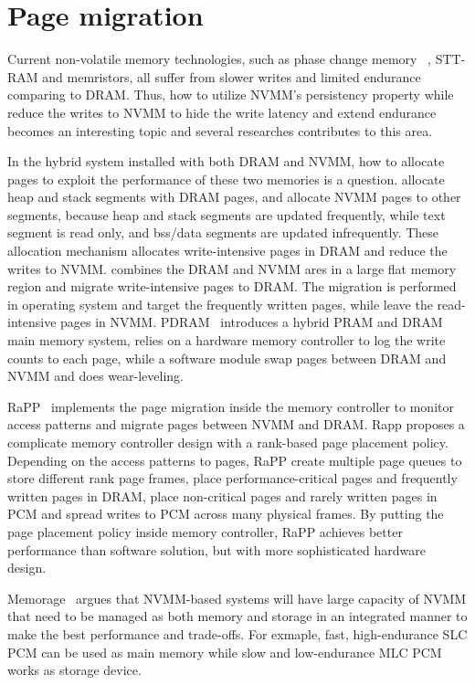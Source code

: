 \section{Page migration} 
\label{sec:migration}

Current non-volatile memory technologies, such as phase change memory
~\cite{PCMHierarchy}, STT-RAM and memristors, all suffer from slower writes and
limited endurance comparing to DRAM.
Thus, how to utilize NVMM's persistency property while reduce the writes to
NVMM to hide the write latency and extend endurance becomes an interesting
topic and several researches contributes to this area.

In the hybrid system installed with both DRAM and NVMM, how to allocate
pages to exploit the performance of these two memories is a question.
\cite{pcmalloc} allocate heap and stack segments with DRAM pages, and allocate
NVMM pages to other segments, because heap and stack segments are updated
frequently, while text segment is read only, and bss/data segments are
updated infrequently. These allocation mechanism allocates write-intensive
pages in DRAM and reduce the writes to NVMM. \cite{pcm3d} combines the DRAM
and NVMM ares in a large flat memory region and migrate write-intensive pages
to DRAM. The migration is performed in operating system and target the
frequently written pages, while leave the read-intensive pages in NVMM.
PDRAM~\cite{pdram} introduces a hybrid PRAM and DRAM main memory system, 
relies on a hardware memory controller to log the write counts to each page,
while a software module swap pages between DRAM and NVMM and does wear-leveling.

RaPP~\cite{RaPP} implements the page migration inside the memory controller
to monitor access patterns and migrate pages between NVMM and DRAM. Rapp
proposes a complicate memory controller design with a rank-based page
placement policy. Depending on the access patterns to pages, RaPP create
multiple page queues to store different rank page frames, place
performance-critical pages and frequently written pages in DRAM, place
non-critical pages and rarely written pages in PCM and spread writes
to PCM across many physical frames. By putting the page placement policy
inside memory controller, RaPP achieves better performance than software
solution, but with more sophisticated hardware design.

Memorage~\cite{memorage} argues that NVMM-based systems will have large
capacity of NVMM that need to be managed as both memory and storage in
an integrated manner to make the best performance and trade-offs. For exmaple,
fast, high-endurance SLC PCM can be used as main memory
while slow and low-endurance MLC PCM works as storage device.

